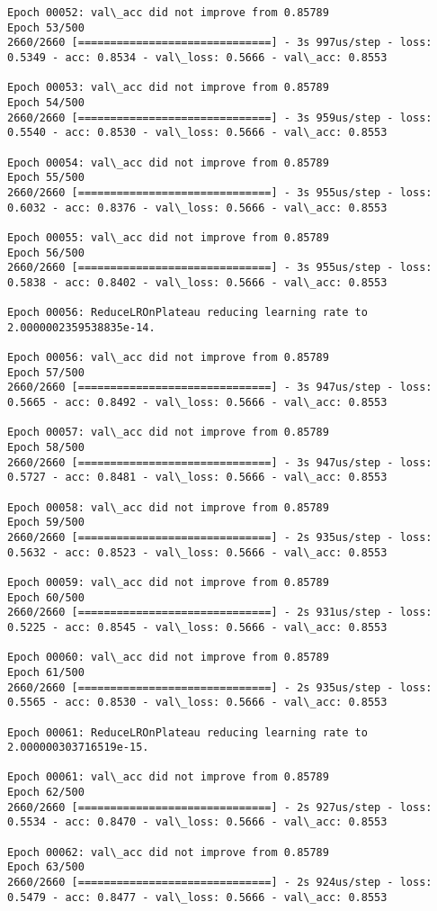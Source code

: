 \documentclass[11pt]{article}
\begin{document}
\begin{Verbatim}[commandchars=\\\{\}]
Epoch 00052: val\_acc did not improve from 0.85789
Epoch 53/500
2660/2660 [==============================] - 3s 997us/step - loss: 0.5349 - acc: 0.8534 - val\_loss: 0.5666 - val\_acc: 0.8553

Epoch 00053: val\_acc did not improve from 0.85789
Epoch 54/500
2660/2660 [==============================] - 3s 959us/step - loss: 0.5540 - acc: 0.8530 - val\_loss: 0.5666 - val\_acc: 0.8553

Epoch 00054: val\_acc did not improve from 0.85789
Epoch 55/500
2660/2660 [==============================] - 3s 955us/step - loss: 0.6032 - acc: 0.8376 - val\_loss: 0.5666 - val\_acc: 0.8553

Epoch 00055: val\_acc did not improve from 0.85789
Epoch 56/500
2660/2660 [==============================] - 3s 955us/step - loss: 0.5838 - acc: 0.8402 - val\_loss: 0.5666 - val\_acc: 0.8553

Epoch 00056: ReduceLROnPlateau reducing learning rate to 2.0000002359538835e-14.

Epoch 00056: val\_acc did not improve from 0.85789
Epoch 57/500
2660/2660 [==============================] - 3s 947us/step - loss: 0.5665 - acc: 0.8492 - val\_loss: 0.5666 - val\_acc: 0.8553

Epoch 00057: val\_acc did not improve from 0.85789
Epoch 58/500
2660/2660 [==============================] - 3s 947us/step - loss: 0.5727 - acc: 0.8481 - val\_loss: 0.5666 - val\_acc: 0.8553

Epoch 00058: val\_acc did not improve from 0.85789
Epoch 59/500
2660/2660 [==============================] - 2s 935us/step - loss: 0.5632 - acc: 0.8523 - val\_loss: 0.5666 - val\_acc: 0.8553

Epoch 00059: val\_acc did not improve from 0.85789
Epoch 60/500
2660/2660 [==============================] - 2s 931us/step - loss: 0.5225 - acc: 0.8545 - val\_loss: 0.5666 - val\_acc: 0.8553

Epoch 00060: val\_acc did not improve from 0.85789
Epoch 61/500
2660/2660 [==============================] - 2s 935us/step - loss: 0.5565 - acc: 0.8530 - val\_loss: 0.5666 - val\_acc: 0.8553

Epoch 00061: ReduceLROnPlateau reducing learning rate to 2.000000303716519e-15.

Epoch 00061: val\_acc did not improve from 0.85789
Epoch 62/500
2660/2660 [==============================] - 2s 927us/step - loss: 0.5534 - acc: 0.8470 - val\_loss: 0.5666 - val\_acc: 0.8553

Epoch 00062: val\_acc did not improve from 0.85789
Epoch 63/500
2660/2660 [==============================] - 2s 924us/step - loss: 0.5479 - acc: 0.8477 - val\_loss: 0.5666 - val\_acc: 0.8553


\end{Verbatim}
\end{document}
